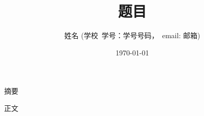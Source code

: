 \documentclass[12pt]{article}
\title{\fontsize{18pt}{27pt}\selectfont%
    {\heiti%
    题目}}%
\author{\fontsize{12pt}{18pt}\selectfont%
    {\fangsong%
       姓名}
    \fontsize{10.5pt}{15.75pt}\selectfont%
    {\fangsong%
        (学校\ 学号：学号号码，\ email: 邮箱)}}%
\date{\today}
\begin{document}
\maketitle


摘要


\newpage
\tableofcontents

\newpage
正文
\end{document}

